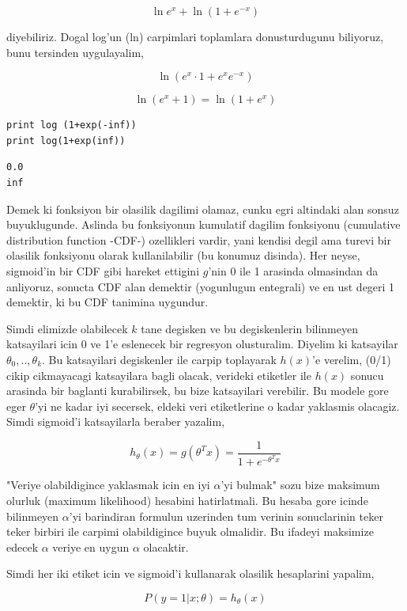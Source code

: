 \documentclass[12pt,fleqn]{article}\usepackage{../common}
\begin{document}
$$ \ln e^{x} + \ln(1+e^{-x})  $$

diyebiliriz. Dogal log'un (ln) carpimlari toplamlara donusturdugunu
biliyoruz, bunu tersinden uygulayalim,

$$ \ln (e^{x}\cdot 1 + e^{x}e^{-x})  $$

$$ \ln (e^{x} + 1)  = \ln (1 + e^{x} )  $$

\begin{verbatim}
print log (1+exp(-inf))
print log(1+exp(inf))
\end{verbatim}

\begin{verbatim}
0.0
inf
\end{verbatim}

Demek ki fonksiyon bir olasilik dagilimi olamaz, cunku egri altindaki
alan sonsuz buyuklugunde. Aslinda bu fonksiyonun kumulatif dagilim
fonksiyonu (cumulative distribution function -CDF-) ozellikleri
vardir, yani kendisi degil ama turevi bir olasilik fonksiyonu olarak
kullanilabilir (bu konumuz disinda).
Her neyse, sigmoid'in bir CDF gibi hareket ettigini $g$'nin 0 ile 1
arasinda olmasindan da anliyoruz, sonucta CDF alan demektir
(yogunlugun entegrali) ve en ust degeri 1 demektir, ki bu CDF tanimina
uygundur.

Simdi elimizde olabilecek $k$ tane degisken ve bu degiskenlerin bilinmeyen
katsayilari icin 0 ve 1'e eslenecek bir regresyon olusturalim. Diyelim ki
katsayilar $\theta_0,..,\theta_k$. Bu katsayilari degiskenler ile carpip
toplayarak $h(x)$'e verelim, (0/1) cikip cikmayacagi katsayilara bagli
olacak, verideki etiketler ile $h(x)$ sonucu arasinda bir baglanti
kurabilirsek, bu bize katsayilari verebilir. Bu modele gore eger
$\theta$'yi ne kadar iyi secersek, eldeki veri etiketlerine o kadar
yaklasmis olacagiz. Simdi sigmoid'i katsayilarla beraber yazalim,

$$ h_\theta(x) = g(\theta^T x) = \frac{1}{1+e^{-\theta^T x}} $$

"Veriye olabildigince yaklasmak icin en iyi $\alpha$'yi bulmak" sozu bize
maksimum olurluk (maximum likelihood) hesabini hatirlatmali. Bu hesaba gore
icinde bilinmeyen $\alpha$'yi barindiran formulun uzerinden tum verinin
sonuclarinin teker teker birbiri ile carpimi olabildigince buyuk
olmalidir. Bu ifadeyi maksimize edecek $\alpha$ veriye en uygun $\alpha$
olacaktir.

Simdi her iki etiket icin ve sigmoid'i kullanarak olasilik hesaplarini
yapalim,

$$ P(y=1 | x;\theta) = h_\theta(x) $$
\end{document}
